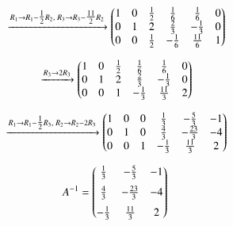 \documentclass[journal]{article}
\begin{document}
\begin{align}
&\xrightarrow{R_1 \to R_1-\tfrac12R_2,\; R_3 \to R_3-\tfrac{11}{2}R_2}
\begin{pmatrix}1 & 0 & \tfrac12 & \tfrac16 & \tfrac16 & 0 \\
       0 & 1 & 2 & \tfrac23 & -\tfrac13 & 0 \\
       0 & 0 & \tfrac12 & -\tfrac16 & \tfrac{11}{6} & 1\end{pmatrix}
\end{align}

\begin{align}
&\xrightarrow{R_3 \to 2R_3}
\begin{pmatrix}1 & 0 & \tfrac12 & \tfrac16 & \tfrac16 & 0 \\
       0 & 1 & 2 & \tfrac23 & -\tfrac13 & 0 \\
       0 & 0 & 1 & -\tfrac13 & \tfrac{11}{3} & 2\end{pmatrix}
\end{align}

\begin{align}
&\xrightarrow{R_1 \to R_1-\tfrac12R_3,\; R_2 \to R_2-2R_3}
\begin{pmatrix}1 & 0 & 0 & \tfrac13 & -\tfrac53 & -1 \\
       0 & 1 & 0 & \tfrac43 & -\tfrac{23}{3} & -4 \\
       0 & 0 & 1 & -\tfrac13 & \tfrac{11}{3} & 2\end{pmatrix}
\end{align}

\begin{align}
A^{-1} &=
\begin{pmatrix}\tfrac13 & -\tfrac53 & -1 \\[6pt]
       \tfrac43 & -\tfrac{23}{3} & -4 \\[6pt]
       -\tfrac13 & \tfrac{11}{3} & 2\end{pmatrix}
\end{align}
\end{document}
